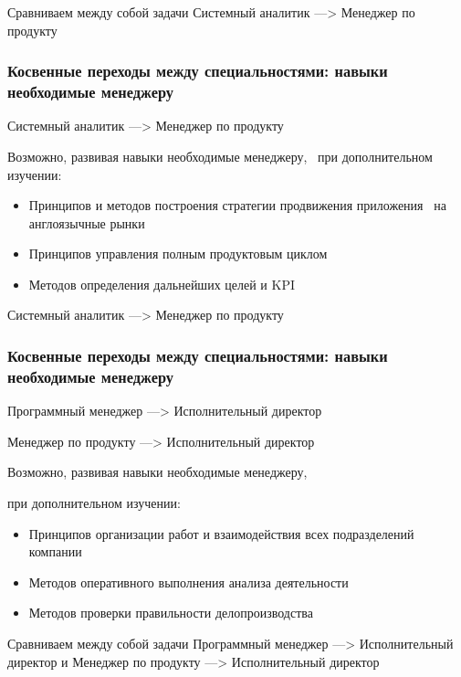 \documentclass{../industrial-development}
\begin{document}
\lecturenotes

Сравниваем между собой задачи Системный аналитик ---> Менеджер по продукту 

\begin{frame} \frametitle{Косвенные переходы между специальностями: навыки необходимые менеджеру}

\begin{block}{Системный аналитик ---> Менеджер по продукту  }

Возможно, развивая навыки необходимые менеджеру, ~при дополнительном изучении:
  \end{block}
\begin{itemize}
\item Принципов и методов построения стратегии продвижения приложения ~на англоязычные рынки
\item Принципов управления полным продуктовым циклом
\item Методов определения дальнейших целей и KPI
\end{itemize}

\end{frame}

\lecturenotes

Системный аналитик ---> Менеджер по продукту


\begin{frame} \frametitle{Косвенные переходы между специальностями: навыки необходимые менеджеру}

\begin{block}{Программный менеджер ---> Исполнительный директор 

Менеджер по продукту  ---> Исполнительный директор }

Возможно, развивая навыки необходимые менеджеру, 

при дополнительном изучении:
  \end{block}
 \begin{itemize}
  \item Принципов организации работ и взаимодействия всех подразделений компании
 \item Методов оперативного выполнения анализа деятельности
 \item Методов проверки правильности делопроизводства
  \end{itemize}
\end{frame}



\lecturenotes

Сравниваем между собой задачи Программный менеджер ---> Исполнительный директор и
Менеджер по продукту  ---> Исполнительный директор
\end{document}

